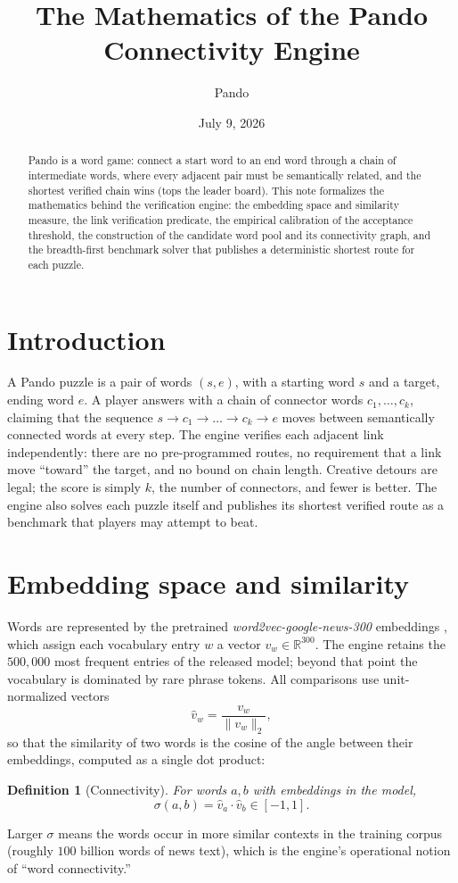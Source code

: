 \documentclass[11pt]{article}
\title{The Mathematics of the Pando Connectivity Engine}
\author{Pando}
\date{July 9, 2026}
\newtheorem{definition}{Definition}
\newcommand{\cosim}{\sigma}
\begin{document}
\maketitle

\begin{abstract}
Pando is a word game: connect a start word to an end word through a chain of
intermediate words, where every adjacent pair must be semantically related, and
the shortest verified chain wins (tops the leader board). This note formalizes the mathematics behind
the verification engine: the embedding space and similarity measure, the link
verification predicate, the empirical calibration of the acceptance threshold,
the construction of the candidate word pool and its connectivity graph, and the
breadth-first benchmark solver that publishes a deterministic shortest route
for each puzzle.
\end{abstract}

\section{Introduction}

A Pando puzzle is a pair of words $(s, e)$, with a starting word $s$ 
and a target, ending word $e$. A player answers with a chain of
connector words $c_1, \dots, c_k$, claiming that the sequence
$s \to c_1 \to \dots \to c_k \to e$ moves between semantically connected words
at every step. The engine verifies each adjacent link independently: there are
no pre-programmed routes, no requirement that a link move ``toward'' the
target, and no bound on chain length. Creative detours are legal; the score is
simply $k$, the number of connectors, and fewer is better. The engine also
solves each puzzle itself and publishes its shortest verified route as a
benchmark that players may attempt to beat. 

\section{Embedding space and similarity}

Words are represented by the pretrained \emph{word2vec-google-news-300}
embeddings \cite{mikolov2013}, which assign each vocabulary entry $w$ a vector
$v_w \in \mathbb{R}^{300}$. The engine retains the $500{,}000$ most frequent
entries of the released model; beyond that point the vocabulary is dominated by
rare phrase tokens. All comparisons use unit-normalized vectors
\[
  \hat{v}_w = \frac{v_w}{\lVert v_w \rVert_2},
\]
so that the similarity of two words is the cosine of the angle between their
embeddings, computed as a single dot product:
\begin{definition}[Connectivity]
For words $a, b$ with embeddings in the model,
\[
  \cosim(a, b) = \hat{v}_a \cdot \hat{v}_b \in [-1, 1].
\]
\end{definition}
Larger $\cosim$ means the words occur in more similar contexts in the training
corpus (roughly $100$ billion words of news text), which is the engine's
operational notion of ``word connectivity.''
\end{document}
